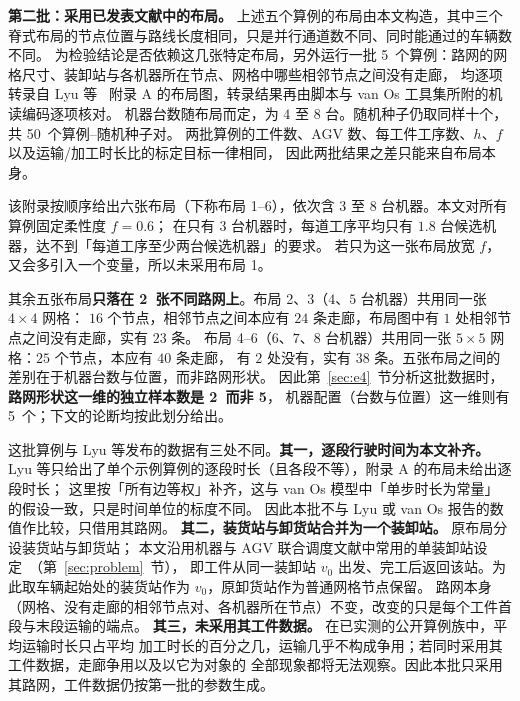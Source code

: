 \documentclass[manuscript,screen,review]{acmart}
\newcommand{\NPubInst}{5}
\newcommand{\NPubPairs}{50}
\newcommand{\NPubNets}{2}
\begin{document}
\textbf{第二批：采用已发表文献中的布局。}
上述五个算例的布局由本文构造，其中三个脊式布局的节点位置与路线长度相同，只是并行通道数不同、同时能通过的车辆数不同。
为检验结论是否依赖这几张特定布局，另外运行一批 \NPubInst\ 个算例：路网的网格尺寸、装卸站与各机器所在节点、网格中哪些相邻节点之间没有走廊，
均逐项转录自 Lyu 等~\cite{lyu2019approach} 附录 A 的布局图，转录结果再由脚本与 van Os 工具集所附的机读编码逐项核对。
机器台数随布局而定，为 \(4\) 至 \(8\) 台。随机种子仍取同样十个，共 \NPubPairs\ 个算例--随机种子对。
两批算例的工件数、AGV 数、每工件工序数、\(h\)、\(f\) 以及运输/加工时长比的标定目标一律相同，
因此两批结果之差只能来自布局本身。

该附录按顺序给出六张布局（下称布局 1--6），依次含 \(3\) 至 \(8\) 台机器。本文对所有算例固定柔性度 \(f=0.6\)；
在只有 \(3\) 台机器时，每道工序平均只有 \(1.8\) 台候选机器，达不到「每道工序至少两台候选机器」的要求。
若只为这一张布局放宽 \(f\)，又会多引入一个变量，所以未采用布局 1。

其余五张布局\textbf{只落在 \NPubNets\ 张不同路网上}。布局 2、3（\(4\)、\(5\) 台机器）共用同一张 \(4\times 4\) 网格：
\(16\) 个节点，相邻节点之间本应有 \(24\) 条走廊，布局图中有 \(1\) 处相邻节点之间没有走廊，实有 \(23\) 条。
布局 4--6（\(6\)、\(7\)、\(8\) 台机器）共用同一张 \(5\times 5\) 网格：\(25\) 个节点，本应有 \(40\) 条走廊，
有 \(2\) 处没有，实有 \(38\) 条。五张布局之间的差别在于机器台数与位置，而非路网形状。
因此第~\ref{sec:e4}~节分析这批数据时，\textbf{路网形状这一维的独立样本数是 \NPubNets\ 而非 \NPubInst}，
机器配置（台数与位置）这一维则有 \NPubInst\ 个；下文的论断均按此划分给出。

这批算例与 Lyu 等发布的数据有三处不同。\textbf{其一，逐段行驶时间为本文补齐。}
Lyu 等只给出了单个示例算例的逐段时长（且各段不等），附录 A 的布局未给出逐段时长；
这里按「所有边等权」补齐，这与 van Os 模型中「单步时长为常量」的假设一致，只是时间单位的标度不同。
因此本批不与 Lyu 或 van Os 报告的数值作比较，只借用其路网。
\textbf{其二，装货站与卸货站合并为一个装卸站。} 原布局分设装货站与卸货站；
本文沿用机器与 AGV 联合调度文献中常用的单装卸站设定~\cite{fontes2023hybrid}（第~\ref{sec:problem}~节），
即工件从同一装卸站 \(v_0\) 出发、完工后返回该站。为此取车辆起始处的装货站作为 \(v_0\)，原卸货站作为普通网格节点保留。
路网本身（网格、没有走廊的相邻节点对、各机器所在节点）不变，改变的只是每个工件首段与末段运输的端点。
\textbf{其三，未采用其工件数据。} 在已实测的公开算例族中，平均运输时长只占平均
加工时长的百分之几，运输几乎不构成争用；若同时采用其工件数据，走廊争用以及以它为对象的
全部现象都将无法观察。因此本批只采用其路网，工件数据仍按第一批的参数生成。
\end{document}
